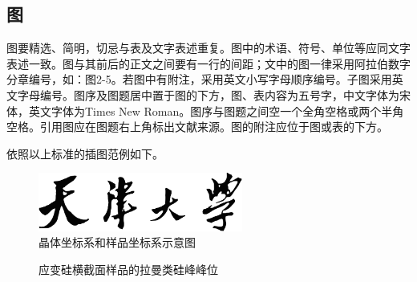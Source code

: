 \subsection{图}

图要精选、简明，切忌与表及文字表述重复。图中的术语、符号、单位等应同文字表述一致。图与其前后的正文之间要有一行的间距；文中的图一律采用阿拉伯数字分章编号，如：图2-5。若图中有附注，采用英文小写字母顺序编号。子图采用英文字母编号。图序及图题居中置于图的下方，图、表内容为五号字，中文字体为宋体，英文字体为Times New Roman。图序与图题之间空一个全角空格或两个半角空格。引用图应在图题右上角标出文献来源。图的附注应位于图或表的下方。

依照以上标准的插图范例如下。


\begin{figure}[!htbp]
  \centering
  \includegraphics[width=0.6\textwidth]{figures/tjuname.png}
  \caption{晶体坐标系和样品坐标系示意图}
  \label{fig:sample1}
\end{figure}

\begin{figure}[!htbp]
  \centering
  \caption{应变硅横截面样品的拉曼类硅峰峰位}
  \label{fig:sample2}
\end{figure}


